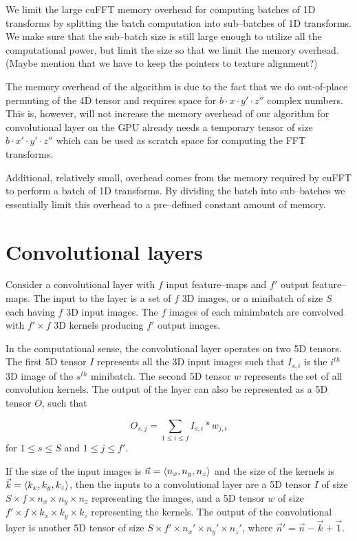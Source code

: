 \documentclass[conference]{IEEEtran}
\DeclarePairedDelimiter{\angled}{\langle}{\rangle}
\begin{document}
We limit the large cuFFT memory overhead for computing batches of 1D
transforms by splitting the batch computation into sub--batches of 1D
transforms.  We make sure that the sub--batch size is still large
enough to utilize all the computational power, but limit the size so
that we limit the memory overhead.  (Maybe mention that we have to
keep the pointers to texture alignment?)

The memory overhead of the algorithm is due to the fact that we do
out-of-place permuting of the 4D tensor and requires space for
$b \cdot x \cdot y' \cdot z''$ complex numbers.  This is, however,
will not increase the memory overhead of our algorithm for
convolutional layer on the GPU already needs a temporary tensor of
size $b \cdot x' \cdot y' \cdot z''$ which can be used as scratch
space for computing the FFT transforms.

Additional, relatively small, overhead comes from the memory required
by cuFFT to perform a batch of 1D transforms.  By dividing the batch
into sub--batches we essentially limit this overhead to a pre--defined
constant amount of memory.

\section{Convolutional layers}

  Consider a convolutional layer with $f$ input feature--maps and $f'$
  output feature--maps.  The input to the layer is a set of $f$ 3D
  images, or a minibatch of size $S$ each having $f$ 3D input images.
  The $f$ images of each minimbatch are convolved with $f' \times f$
  3D kernels producing $f'$ output images.

  In the computational sense, the convolutional layer operates on two
  5D tensors.  The first 5D tensor $I$ represents all the 3D input
  images such that $I_{s,i}$ is the $i^{th}$ 3D image of the $s^{th}$
  minibatch.  The second 5D tensor $w$ represents the set of all
  convolution kernels.  The output of the layer can also be
  represented as a 5D tensor $O$, such that

  $$O_{s,j} = \sum_{1 \le i \le f} I_{s,i} \ast w_{j,i}$$
  for $1 \le s \le S$ and $1 \le j \le f'$.

  If the size of the input images is $\vec{n} = \angled{n_x, n_y,
  n_z}$ and the size of the kernels is $\vec{k}
  = \angled{k_x,k_y,k_z}$, then the inputs to a convolutional layer
  are a 5D tensor $I$ of size $S \times f \times n_x \times n_y \times
  n_z$ representing the images, and a 5D tensor $w$ of size $f' \times
  f \times k_x \times k_y \times k_z$ representing the kernels.  The
  output of the convolutional layer is another 5D tensor of size
  $S \times f' \times n_x' \times n_y' \times n_z'$, where $\vec{n}'
  = \vec{n} - \vec{k} + \vec{1}$.
\end{document}

